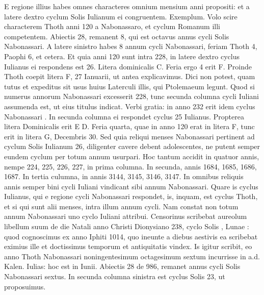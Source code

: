 E regione illius habes omnes characteres omnium mensium anni propositi:
et a latere dextro cyclum Solis Iulianum ei congruentem.
%
Exemplum.
Volo scire characterem Thoth anni 120 a Nabonassaro,
et cyclum Romanum illi competentem.
Abiectis 28, remanent 8,
qui est octavus annus cycli Solis Nabonassari.
A latere sinistro habes
8 annum cycli Nabonassari, feriam Thoth 4, Paophi 6, et cetera.
Et quia
anni 120 sunt intra 228, in latere dextro cyclus Iulianus ei respondens
est 26.
Litera dominicalis \textsc{C}.
Feria ergo 4 erit \textsc{F}. %
Proinde Thoth coepit
litera F, 27 Ianuarii, ut antea explicavimus.
Dici non potest, quam tutus
et expeditus sit usus huius Laterculi illis, qui Ptolemaeum legunt.
Quod si numerus annorum Nabonassari excesserit 228, tunc secunda
columna cycli Iuliani assumenda est, ut eius titulus indicat.
Verbi gratia: in anno 232 erit idem cyclus Nabonassari .
In secunda columna ei respondet cyclus 25 Iulianus.
Propterea litera Dominicalis erit \textsc{E D}.
Feria quarta, quae in anno 120 erat in litera \textsc{F}, tunc erit
in litera \textsc{G}, Decembris 30.
Sed quia reliqui menses Nabonassari pertinent
ad cyclum Solis Iulianum 26, diligenter cavere debent adolescentes,
ne putent semper eundem cyclum per totum annum usurpari.
Hoc tantum accidit in quatuor annis, nempe 224, 225, 226, 227, in
prima columna.
In secunda, annis 1684, 1685, 1686, 1687.
In
tertia culumna, in annis 3144, 3145, 3146, 3147.
In omnibus reliquis
annis semper bini cycli Iuliani vindicant sibi annum Nabonassari.
Quare is cyclus Iulianus, qui e regione cycli Nabonassari respondet,
is, inquam, est cyclus Thoth, et si qui sunt alii menses, intra illum annum
cycli.
Nam constat non totum annum Nabonassari uno cyclo
Iuliani attribui.
Censorinus scribebat aureolum libellum suum de
die Natali anno Christi Dionysiano 238, cyclo Solis , Lunae
: quod cognoscimus ex anno Iphiti 1014, quo ineunte a diebus
aestivis ea scribebat eximius ille et doctissimus temporum et antiquitatis
vindex.
Is igitur scribit, eo anno Thoth Nabonassari noningentesimum
octagesimum sextum incurrisse in a.d.  Kalen. Iulias:
hoc est in  Iunii.
Abiectis 28 de 986, remanet annus cycli Solis
Nabonassari sextus.
In secunda columna sinistra est cyclus Solis
23, ut proposuimus.
